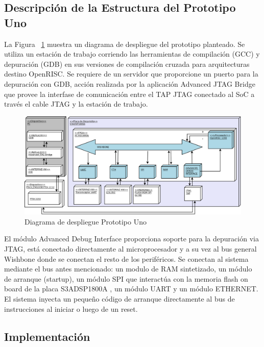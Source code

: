 \newpage
		\subsection{Descripción de la Estructura del Prototipo Uno}
			

		La Figura ~\ref{fig:minsoc} muestra un diagrama de despliegue del prototipo planteado. Se utiliza un estación de trabajo corriendo las herramientas de compilación (GCC) y depuración (GDB) en sus versiones de compilación cruzada para arquitecturas destino OpenRISC. Se requiere de un
		servidor que proporcione un puerto para la depuración con GDB, acción realizada por la aplicación Advanced JTAG Bridge que provee la interfase de comunicación entre el TAP JTAG conectado al SoC a través el cable JTAG y la estación de trabajo.
		
		\begin{figure}[!h]
 		\begin{center}
  		\includegraphics[width=1\textwidth,keepaspectratio=true]{./images/proto1}
  		\caption{Diagrama de despliegue Prototipo Uno }
  		\label{fig:minsoc}
 		\end{center}
		\end{figure}
		
		El módulo Advanced Debug Interface proporciona soporte para la depuración via JTAG, está conectado directamente al microprocesador y a su vez al bus
		general Wishbone donde se conectan el resto de los periféricos. Se conectan al sistema mediante el bus antes mencionado: un modulo	de RAM
		sintetizado, un módulo de arranque (startup), un módulo SPI que interactúa con la memoria flash on board de la placa S3ADSP1800A , un módulo UART y
		un módulo ETHERNET. El sistema inyecta un pequeño código de arranque directamente al bus de instrucciones al iniciar o luego de un reset. 

\newpage
			
		\subsection{Implementación}

